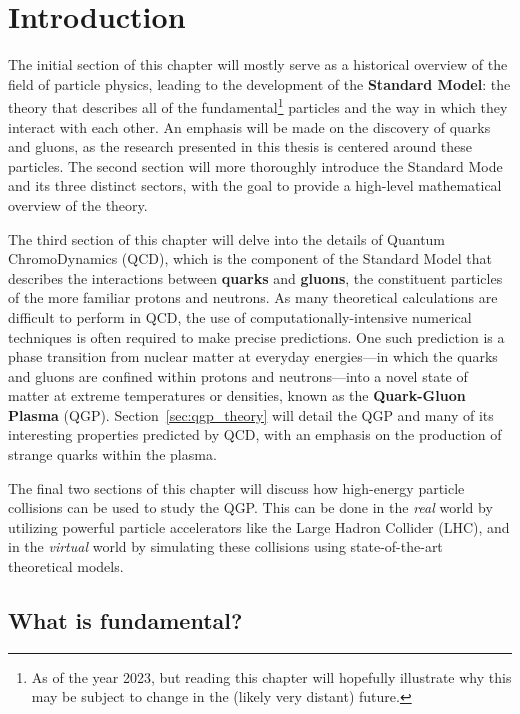 \chapter{Introduction}
\label{ch:introduction}

The initial section of this chapter will mostly serve as a historical overview of the field of particle physics, leading to the development of the \textbf{Standard Model}: the theory that describes all of the fundamental\footnote{As of the year 2023, but reading this chapter will hopefully illustrate why this may be subject to change in the (likely very distant) future.} particles and the way in which they interact with each other. An emphasis will be made on the discovery of quarks and gluons, as the research presented in this thesis is centered around these particles. The second section will more thoroughly introduce the Standard Mode and its three distinct sectors, with the goal to provide a high-level mathematical overview of the theory.

The third section of this chapter will delve into the details of Quantum ChromoDynamics (QCD), which is the component of the Standard Model that describes the interactions between \textbf{quarks} and \textbf{gluons}, the constituent particles of the more familiar protons and neutrons. As many theoretical calculations are difficult to perform in QCD, the use of computationally-intensive numerical techniques is often required to make precise predictions. One such prediction is a phase transition from nuclear matter at everyday energies---in which the quarks and gluons are confined within protons and neutrons---into a novel state of matter at extreme temperatures or densities, known as the \textbf{Quark-Gluon Plasma} (QGP). Section~\ref{sec:qgp_theory} will detail the QGP and many of its interesting properties predicted by QCD, with an emphasis on the production of strange quarks within the plasma.

The final two sections of this chapter will discuss how high-energy particle collisions can be used to study the QGP. This can be done in the \textit{real} world by utilizing powerful particle accelerators like the Large Hadron Collider (LHC), and in the \textit{virtual} world by simulating these collisions using state-of-the-art theoretical models.

\clearpage

\section{What is fundamental?}
\label{sec:fundamental}

